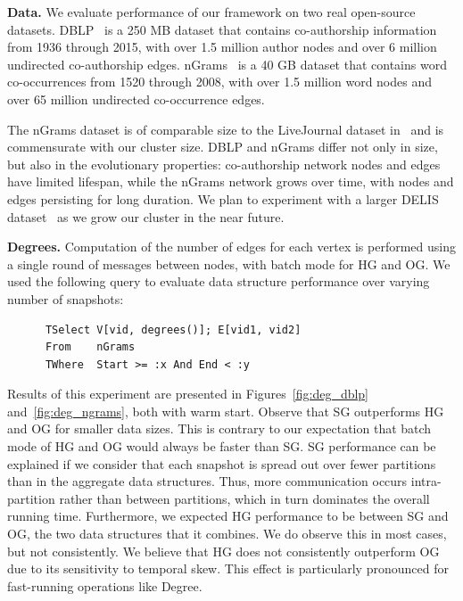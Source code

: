 {\bf Data.}  We evaluate performance of our framework on two real
open-source datasets.
DBLP~\cite{dblp} is a 250 MB dataset that contains co-authorship
information from 1936 through 2015, with over 1.5 million author nodes
and over 6 million undirected co-authorship edges. 
%
nGrams~\cite{nGrams} is a 40 GB dataset that contains word
co-occurrences from 1520 through 2008, with over 1.5 million word
nodes and over 65 million undirected co-occurrence edges.

The nGrams dataset is of comparable size to the LiveJournal dataset
in~\cite{Xin2013} and is commensurate with our cluster size.  DBLP and
nGrams differ not only in size, but also in the evolutionary
properties: co-authorship network nodes and edges have limited
lifespan, while the nGrams network grows over time, with nodes and
edges persisting for long duration.  
We plan to experiment with a larger DELIS
dataset~\cite{BoVWFI} as we grow our cluster in the near future.


{\bf Degrees.} Computation of the number of edges for each vertex is
performed using a single round of messages between nodes, with batch
mode for HG and OG.  We used the following query to evaluate data
structure performance over varying number of snapshots:

\begin{small}
\begin{verbatim}
      TSelect V[vid, degrees()]; E[vid1, vid2]
      From    nGrams
      TWhere  Start >= :x And End < :y
\end{verbatim}
\end{small}

Results of this experiment are presented in Figures~\ref{fig:deg_dblp}
and~\ref{fig:deg_ngrams}, both with warm start.  Observe that SG
outperforms HG and OG for smaller data sizes.  This is contrary to our
expectation that batch mode of HG and OG would always be faster than
SG.  SG performance can be explained if we consider that each snapshot
is spread out over fewer partitions than in the aggregate data
structures.  Thus, more communication occurs intra-partition rather
than between partitions, which in turn dominates the overall running
time.  Furthermore, we expected HG performance to be between SG and
OG, the two data structures that it combines.  We do observe this in
most cases, but not consistently.  We believe that HG does not
consistently outperform OG due to its sensitivity to temporal skew.
This effect is particularly pronounced for fast-running operations
like Degree.

